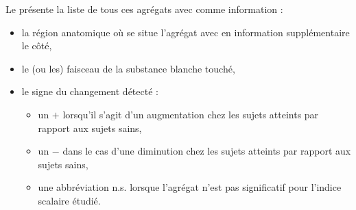 Le  présente la liste de tous ces agrégats avec comme information : 
\begin{itemize}
    \item la région anatomique où se situe l'agrégat avec en information supplémentaire le côté,
    \item le (ou les) faisceau de la substance blanche touché,
    \item le signe du changement détecté :
    \begin{itemize}
        \item un \og $+$ \fg lorsqu'il s'agit d'un augmentation chez les sujets atteints par rapport aux sujets sains,
        \item un \og $-$ \fg dans le cas d'une diminution chez les sujets atteints par rapport aux sujets sains,
        \item une abbréviation \og n.s. \fg lorsque l'agrégat n'est pas significatif pour l'indice scalaire étudié.
    \end{itemize}
\end{itemize}



% 
% 
% 

